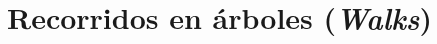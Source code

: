 \documentclass[usenames, dvipsnames, spanish, c]{beamer}
\begin{document}
\section{Recorridos en árboles (\textit{Walks})}





\end{document}
